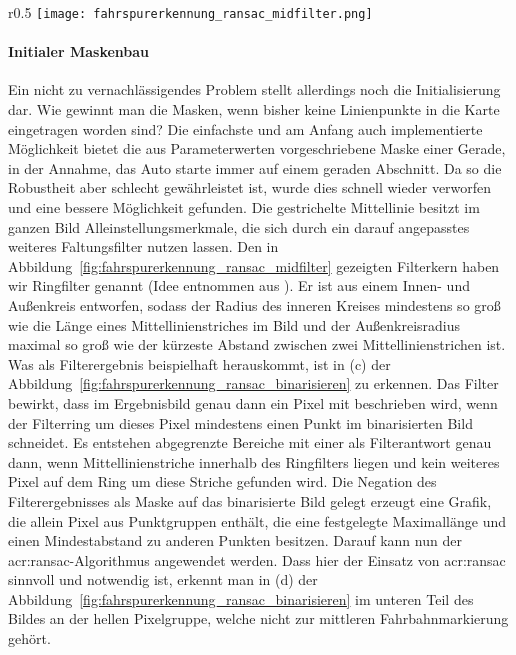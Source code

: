 \begin{wrapfigure}{r}{0.5\textwidth}
 \centering
  \texttt{[image: fahrspurerkennung\_ransac\_midfilter.png]}
  \caption{Der Kern des \\ \glqq Ringfilters\grqq}
\label{fig:fahrspurerkennung_ransac_midfilter}
\end{wrapfigure} 

\paragraph{Initialer Maskenbau} 
\label{par:maskenbau:initial}

Ein nicht zu vernachlässigendes Problem stellt allerdings noch die Initialisierung dar. Wie gewinnt man die Masken, wenn bisher keine Linienpunkte in die Karte eingetragen worden sind? Die einfachste und am Anfang auch implementierte Möglichkeit bietet die aus Parameterwerten vorgeschriebene Maske einer Gerade, in der Annahme, das Auto starte immer auf einem geraden Abschnitt. Da so die Robustheit aber schlecht gewährleistet ist, wurde dies schnell wieder verworfen und eine bessere Möglichkeit gefunden. Die gestrichelte Mittellinie besitzt im ganzen Bild Alleinstellungsmerkmale, die sich durch ein darauf angepasstes weiteres Faltungsfilter nutzen lassen. Den in Abbildung~\ref{fig:fahrspurerkennung_ransac_midfilter} gezeigten Filterkern haben wir \glqq Ringfilter\grqq{} genannt (Idee entnommen aus \autocite{drauschkeEchtzeitfaehigeStartpunktalgorithmenFuer2016}). Er ist aus einem Innen- und Außenkreis entworfen, sodass der Radius des inneren Kreises mindestens so groß wie die Länge eines Mittellinienstriches im Bild und der Außenkreisradius maximal so groß wie der kürzeste Abstand zwischen zwei Mittellinienstrichen ist. Was als Filterergebnis beispielhaft herauskommt, ist in (c) der Abbildung~\ref{fig:fahrspurerkennung_ransac_binarisieren} zu erkennen. Das Filter bewirkt, dass im Ergebnisbild genau dann ein Pixel mit \grqq{} beschrieben wird, wenn der Filterring um dieses Pixel mindestens einen Punkt im binarisierten Bild schneidet. Es entstehen abgegrenzte Bereiche mit einer \grqq{} als Filterantwort genau dann, wenn Mittellinienstriche innerhalb des \glqq Ringfilters\grqq{} liegen und kein weiteres Pixel auf dem Ring um diese Striche gefunden wird. Die Negation des Filterergebnisses als Maske auf das binarisierte Bild gelegt erzeugt eine Grafik, die allein Pixel aus Punktgruppen enthält, die eine festgelegte Maximallänge und einen Mindestabstand zu anderen Punkten besitzen. Darauf kann nun der \gls{acr:ransac}-Algorithmus angewendet werden. Dass hier der Einsatz von \gls{acr:ransac} sinnvoll und notwendig ist, erkennt man in (d) der Abbildung~\ref{fig:fahrspurerkennung_ransac_binarisieren} im unteren Teil des Bildes an der hellen Pixelgruppe, welche nicht zur mittleren Fahrbahnmarkierung gehört.

